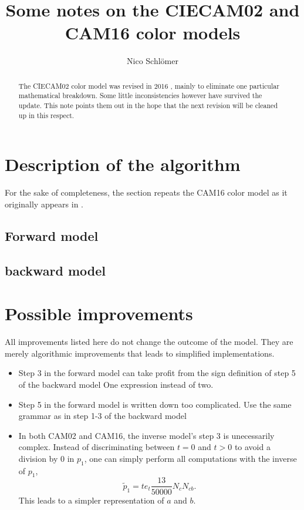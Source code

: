 \documentclass{scrartcl}
\title{Some notes on the CIECAM02 and CAM16 color models}
\author{Nico Schlömer}
\begin{document}
\maketitle
\begin{abstract}
  The CIECAM02 color model \cite{} was revised in 2016 \cite{}, mainly to
  eliminate one particular mathematical breakdown. Some little inconsistencies
  however have survived the update. This note points them out in the hope that
  the next revision will be cleaned up in this respect.
\end{abstract}


\section{Description of the algorithm}

For the sake of completeness, the section repeats the CAM16 color model as it
originally appears in \cite{}.

\subsection{Forward model}

\subsection{backward model}


\section{Possible improvements}

All improvements listed here do not change the outcome of the model.  They are
merely algorithmic improvements that leads to simplified implementations.

\begin{itemize}

\item Step 3 in the forward model can take profit from the sign definition of
step 5 of the backward model  One expression instead of two.

\item Step 5 in the forward model is written down too complicated. Use the same
grammar as in step 1-3 of the backward model

\item
In both CAM02 and CAM16, the inverse model's step 3 is unecessarily complex.
Instead of discriminating between $t=0$ and $t>0$ to avoid a division by $0$
in $p_1$, one can simply perform all computations with the inverse of $p_1$,
\[
\tilde{p}_1 = t e_t \frac{13}{50000} N_c N_{cb}.
\]
This leads to a simpler representation of $a$ and $b$.
\end{itemize}
\end{document}
